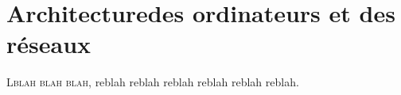 \chapter[Architecture des ordinateurs et réseaux]{Architecture\newline des ordinateurs et des réseaux}
\label{chap:VII}

\lettrine{L}{blah blah blah}, reblah reblah reblah reblah reblah reblah. 

\section[]{}
\label{sec:VII.1}



\subsection[]{}
\label{sub:VII.1.1}



\subsubsection[]{}
\label{subsub:VII.1.1.1}


\subsubsection[]{}
\label{subsub:VII.1.1.2}





\subsection[]{}
\label{sub:VII.1.2}










\section[]{}
\label{sec:VII.2}



\subsection[]{}
\label{sub:VII.2.1}




